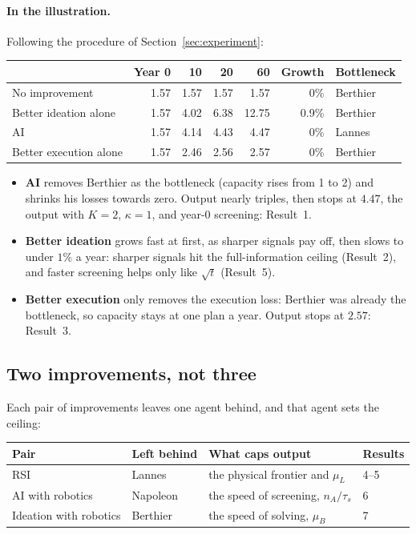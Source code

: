 \documentclass[11pt]{article}
\newcommand{\Nap}{\textcolor{nap}{Napoleon}}
\newcommand{\Ber}{\textcolor{ber}{Berthier}}
\newcommand{\Lan}{\textcolor{lan}{Lannes}}
\theoremstyle{remark}
\begin{document}
\paragraph{In the illustration.} Following the procedure of Section~\ref{sec:experiment}:
\begin{center}
\renewcommand{\arraystretch}{1.12}
\begin{tabular}{@{}l r r r r r l@{}}
\toprule
& Year 0 & 10 & 20 & 60 & Growth & Bottleneck\\
\midrule
No improvement & 1.57 & 1.57 & 1.57 & 1.57 & 0\% & \Ber\\
Better ideation alone & 1.57 & 4.02 & 6.38 & 12.75 & 0.9\% & \Ber\\
\textcolor{ber}{AI} & 1.57 & 4.14 & 4.43 & 4.47 & 0\% & \Lan\\
Better execution alone & 1.57 & 2.46 & 2.56 & 2.57 & 0\% & \Ber\\
\bottomrule
\end{tabular}
\end{center}
\begin{itemize}
  \item \textbf{AI} removes \Ber{} as the bottleneck (capacity rises from 1 to 2) and shrinks his losses towards zero. Output nearly triples, then stops at $4.47$, the output with $K=2$, $\kappa=1$, and year-0 screening: Result~1.
  \item \textbf{Better ideation} grows fast at first, as sharper signals pay off, then slows to under $1\%$ a year: sharper signals hit the full-information ceiling (Result~2), and faster screening helps only like $\sqrt t$ (Result~5).
  \item \textbf{Better execution} only removes the execution loss: \Ber{} was already the bottleneck, so capacity stays at one plan a year. Output stops at $2.57$: Result~3.
\end{itemize}

\subsection{Two improvements, not three}

Each pair of improvements leaves one agent behind, and that agent sets the ceiling:
\begin{center}
\renewcommand{\arraystretch}{1.12}
\begin{tabular}{@{}l l l l@{}}
\toprule
Pair & Left behind & What caps output & Results\\
\midrule
RSI & \Lan & the physical frontier and $\mu_L$ & 4--5\\
AI with robotics & \Nap & the speed of screening, $n_A/\tau_s$ & 6\\
Ideation with robotics & \Ber & the speed of solving, $\mu_B$ & 7\\
\bottomrule
\end{tabular}
\end{center}
\end{document}
